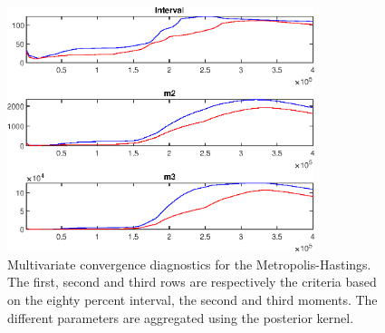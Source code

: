  
\begin{figure}[H]
\centering 
\includegraphics[width=0.8\textwidth]{BRS_sectoral_wo_vcu/Output/BRS_sectoral_wo_vcu_mdiag}
\caption{Multivariate convergence diagnostics for the Metropolis-Hastings.
The first, second and third rows are respectively the criteria based on
the eighty percent interval, the second and third moments. The different 
parameters are aggregated using the posterior kernel.}\label{Fig:MultivariateDiagnostics}
\end{figure}


